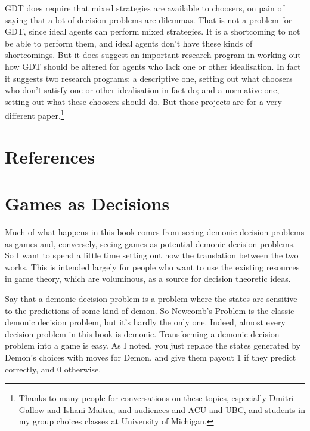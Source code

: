 \documentclass[
  12pt,
  letterpaper,
  DIV=11,
  numbers=noendperiod]{scrreprt}
\begin{document}
GDT does require that mixed strategies are available to choosers, on
pain of saying that a lot of decision problems are dilemmas. That is not
a problem for GDT, since ideal agents can perform mixed strategies. It
is a shortcoming to not be able to perform them, and ideal agents don't
have these kinds of shortcomings. But it does suggest an important
research program in working out how GDT should be altered for agents who
lack one or other idealisation. In fact it suggests two research
programs: a descriptive one, setting out what choosers who don't satisfy
one or other idealisation in fact do; and a normative one, setting out
what these choosers should do. But those projects are for a very
different paper.\footnote{Thanks to many people for conversations on
  these topics, especially Dmitri Gallow and Ishani Maitra, and
  audiences and ACU and UBC, and students in my group choices classes at
  University of Michigan.}


\chapter*{References}\label{references}


\cleardoublepage
{}
{}
\appendix

\chapter{Games as Decisions}\label{sec-gad}

Much of what happens in this book comes from seeing demonic decision
problems as games and, conversely, seeing games as potential demonic
decision problems. So I want to spend a little time setting out how the
translation between the two works. This is intended largely for people
who want to use the existing resources in game theory, which are
voluminous, as a source for decision theoretic ideas.

Say that a demonic decision problem is a problem where the states are
sensitive to the predictions of some kind of demon. So Newcomb's Problem
is the classic demonic decision problem, but it's hardly the only one.
Indeed, almost every decision problem in this book is demonic.
Transforming a demonic decision problem into a game is easy. As I noted,
you just replace the states generated by Demon's choices with moves for
Demon, and give them payout 1 if they predict correctly, and 0
otherwise.
\end{document}
